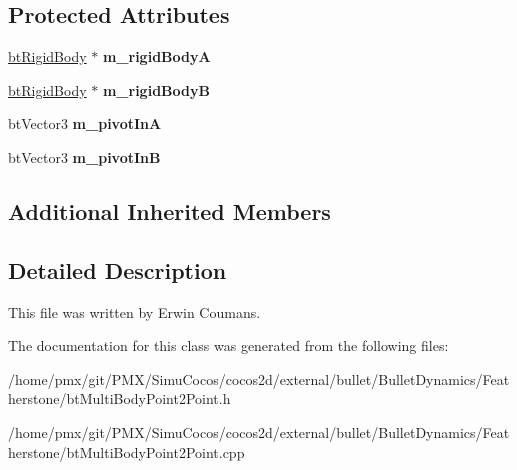 \subsection*{Protected Attributes}
\begin{DoxyCompactItemize}
\item 
\mbox{\label{classbtMultiBodyPoint2Point_a4023223aedf04e8b1e0fa087b147c457}} 
\hyperlink{classbtRigidBody}{bt\+Rigid\+Body} $\ast$ {\bfseries m\+\_\+rigid\+BodyA}
\item 
\mbox{\label{classbtMultiBodyPoint2Point_a61f214f7c2b7be63925e061bfbd02f2c}} 
\hyperlink{classbtRigidBody}{bt\+Rigid\+Body} $\ast$ {\bfseries m\+\_\+rigid\+BodyB}
\item 
\mbox{\label{classbtMultiBodyPoint2Point_ad3e1812e91479d2e73a3c0b34d2cc26a}} 
bt\+Vector3 {\bfseries m\+\_\+pivot\+InA}
\item 
\mbox{\label{classbtMultiBodyPoint2Point_a9a50e6480f1cb00db53937594484226e}} 
bt\+Vector3 {\bfseries m\+\_\+pivot\+InB}
\end{DoxyCompactItemize}
\subsection*{Additional Inherited Members}


\subsection{Detailed Description}
This file was written by Erwin Coumans. 

The documentation for this class was generated from the following files\+:\begin{DoxyCompactItemize}
\item 
/home/pmx/git/\+P\+M\+X/\+Simu\+Cocos/cocos2d/external/bullet/\+Bullet\+Dynamics/\+Featherstone/bt\+Multi\+Body\+Point2\+Point.\+h\item 
/home/pmx/git/\+P\+M\+X/\+Simu\+Cocos/cocos2d/external/bullet/\+Bullet\+Dynamics/\+Featherstone/bt\+Multi\+Body\+Point2\+Point.\+cpp\end{DoxyCompactItemize}

